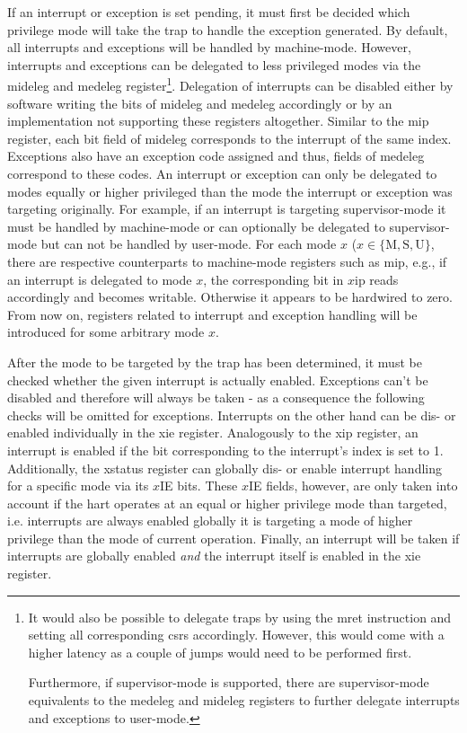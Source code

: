 If an interrupt or exception is set pending, it must first be decided which privilege mode will take the trap to handle the exception generated.
By default, all interrupts and exceptions will be handled by machine-mode.
However, interrupts and exceptions can be delegated to less privileged modes via the \gls{mideleg} and \gls{medeleg} register\footnote{%
    It would also be possible to delegate traps by using the \gls{mret} instruction and setting all corresponding \glspl{csr} accordingly.
    However, this would come with a higher latency as a couple of jumps would need to be performed first.

    Furthermore, if supervisor-mode is supported, there are supervisor-mode equivalents to the \gls{medeleg} and \gls{mideleg} registers to further delegate interrupts and exceptions to user-mode.
}.
Delegation of interrupts can be disabled either by software writing the bits of \gls{mideleg} and \gls{medeleg} accordingly or by an implementation not supporting these registers altogether.
Similar to the \gls{mip} register, each bit field of \gls{mideleg} corresponds to the interrupt of the same index.
Exceptions also have an exception code assigned and thus, fields of \gls{medeleg} correspond to these codes.
An interrupt or exception can only be delegated to modes equally or higher privileged than the mode the interrupt or exception was targeting originally.
For example, if an interrupt is targeting supervisor-mode it must be handled by machine-mode or can optionally be delegated to supervisor-mode but can not be handled by user-mode.
For each mode $ x $ ($ x \in \{ \text{M}, \text{S}, \text{U}\} $, there are respective counterparts to machine-mode registers such as \gls{mip}, e.g., if an interrupt is delegated to mode $ x $, the corresponding bit in $ x\text{ip} $ reads accordingly and becomes writable.
Otherwise it appears to be hardwired to zero.
From now on, registers related to interrupt and exception handling will be introduced for some arbitrary mode $ x $.

After the mode to be targeted by the trap has been determined, it must be checked whether the given interrupt is actually enabled.
Exceptions can't be disabled and therefore will always be taken - as a consequence the following checks will be omitted for exceptions.
Interrupts on the other hand can be dis- or enabled individually in the \gls{xie} register.
Analogously to the \gls{xip} register, an interrupt is enabled if the bit corresponding to the interrupt's index is set to 1.
Additionally, the \gls{xstatus} register can globally dis- or enable interrupt handling for a specific mode via its $x$IE bits.
These $x$IE fields, however, are only taken into account if the \gls{hart} operates at an equal or higher privilege mode than targeted, i.e. interrupts are always enabled globally it is targeting a mode of higher privilege than the mode of current operation.
Finally, an interrupt will be taken if interrupts are globally enabled \textit{and} the interrupt itself is enabled in the \gls{xie} register.

